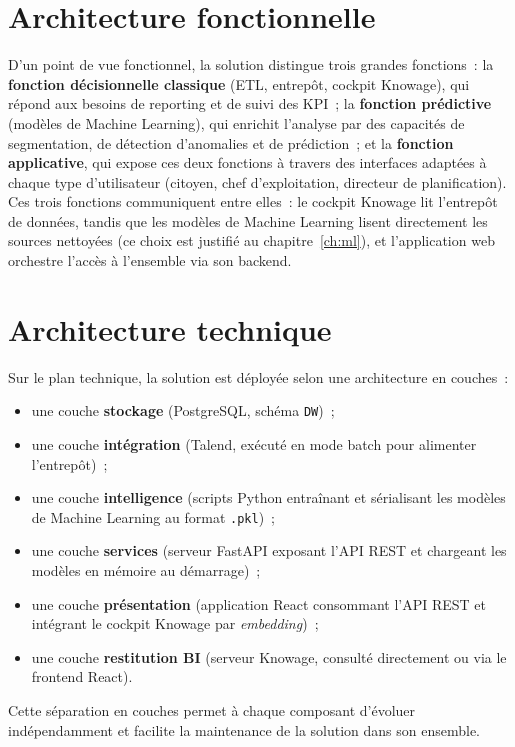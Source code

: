 \section{Architecture fonctionnelle}
D'un point de vue fonctionnel, la solution distingue trois grandes fonctions~: la \textbf{fonction décisionnelle classique} (ETL, entrepôt, cockpit Knowage), qui répond aux besoins de reporting et de suivi des KPI~; la \textbf{fonction prédictive} (modèles de Machine Learning), qui enrichit l'analyse par des capacités de segmentation, de détection d'anomalies et de prédiction~; et la \textbf{fonction applicative}, qui expose ces deux fonctions à travers des interfaces adaptées à chaque type d'utilisateur (citoyen, chef d'exploitation, directeur de planification). Ces trois fonctions communiquent entre elles~: le cockpit Knowage lit l'entrepôt de données, tandis que les modèles de Machine Learning lisent directement les sources nettoyées (ce choix est justifié au chapitre~\ref{ch:ml}), et l'application web orchestre l'accès à l'ensemble via son backend.

\section{Architecture technique}
Sur le plan technique, la solution est déployée selon une architecture en couches~:

\begin{itemize}
\item une couche \textbf{stockage} (PostgreSQL, schéma \texttt{DW})~;
\item une couche \textbf{intégration} (Talend, exécuté en mode batch pour alimenter l'entrepôt)~;
\item une couche \textbf{intelligence} (scripts Python entraînant et sérialisant les modèles de Machine Learning au format \texttt{.pkl})~;
\item une couche \textbf{services} (serveur FastAPI exposant l'API REST et chargeant les modèles en mémoire au démarrage)~;
\item une couche \textbf{présentation} (application React consommant l'API REST et intégrant le cockpit Knowage par \textit{embedding})~;
\item une couche \textbf{restitution BI} (serveur Knowage, consulté directement ou via le frontend React).
\end{itemize}

Cette séparation en couches permet à chaque composant d'évoluer indépendamment et facilite la maintenance de la solution dans son ensemble.

